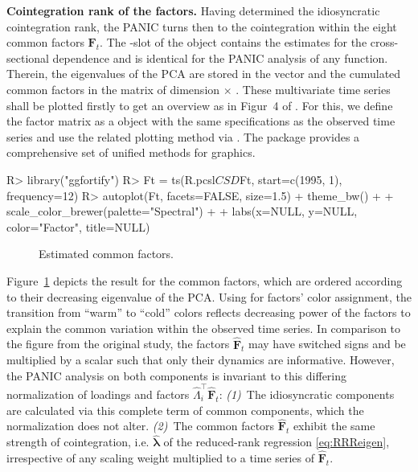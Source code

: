 \textbf{Cointegration rank of the factors.} Having determined the idiosyncratic cointegration rank, the PANIC turns then to the cointegration within the eight common factors $ \boldsymbol{F}_{t} $. The -slot of the  object contains the estimates for the cross-sectional dependence and is identical for the PANIC analysis of any  function. Therein, the eigenvalues of the PCA are stored in the vector  and the cumulated common factors in the matrix  of dimension  $ \times $ . These multivariate time series shall be plotted firstly to get an overview as in Figur~4 of \citet[p.~71]{ArsovaOersal2017}. For this, we define the factor matrix  as a  object with the same specifications as the observed time series and use the related plotting method via . The package  \citep{TangEtAl2016} provides a comprehensive set of unified methods for  graphics.
\begin{CodeChunk}
\begin{CodeInput}
R> library("ggfortify")
R> Ft = ts(R.pcsl$CSD$Ft, start=c(1995, 1), frequency=12)
R> autoplot(Ft, facets=FALSE, size=1.5) + theme_bw() + 
+     scale_color_brewer(palette="Spectral") +
+     labs(x=NULL, y=NULL, color="Factor", title=NULL)
\end{CodeInput}
\end{CodeChunk}
\begin{figure}[ht] %
	\centering
	\caption{Estimated common factors.}
	\resizebox{0.8\textwidth}{!}{
		}
	\label{fig:Factors}
\end{figure}
Figure~\ref{fig:Factors} depicts the  result for the common factors, which are ordered according to their decreasing eigenvalue of the PCA. Using  for factors' color assignment, the transition from ``warm'' to ``cold'' colors reflects decreasing power of  the factors to explain the common variation within the observed time series. In comparison to the figure from the original study, the factors $ \boldsymbol{\hat{F}}_t $ may have switched signs and be multiplied by a scalar such that only their dynamics are informative. However, the PANIC analysis on both components is invariant to this differing normalization of loadings and factors $ \hat{\Lambda}_i^\top \boldsymbol{\hat{F}}_t $: \textit{(1)}~The idiosyncratic components are calculated via this complete term of common components, which the normalization does not alter. \textit{(2)}~The common factors $ \boldsymbol{\hat{F}}_{t} $ exhibit the same strength of cointegration, i.e. $ \boldsymbol{\hat{\lambda}} $ of the reduced-rank regression \eqref{eq:RRReigen}, irrespective of any scaling weight multiplied to a time series of $ \boldsymbol{\hat{F}}_{t} $.

